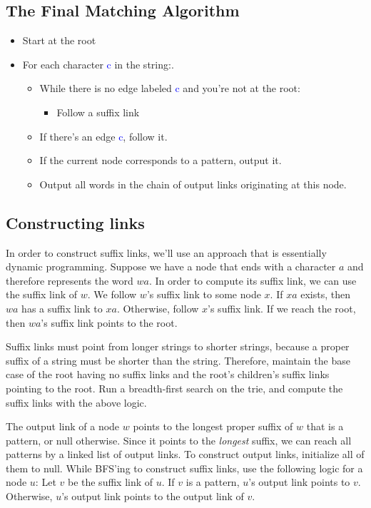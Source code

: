 \documentclass[11pt, oneside]{article}
\begin{document}
\subsection{The Final Matching Algorithm}

\begin{itemize}
    \item Start at the root
    \item For each character \textcolor{blue}{c} in the string:.
      \begin{itemize}
        \item While there is no edge labeled \textcolor{blue}{c} and you're not at the root:
          \begin{itemize}
            \item Follow a suffix link
          \end{itemize}
        \item If there's an edge \textcolor{blue}{c}, follow it.
        \item If the current node corresponds to a pattern, output it.
        \item Output all words in the chain of output links originating at this node.
      \end{itemize}
\end{itemize}

\newpage

\subsection{Constructing links}

In order to construct suffix links, we'll use an approach that is essentially dynamic programming.
Suppose we have a node that ends with a character \( a \) and therefore represents the word \( wa \).
In order to compute its suffix link, we can use the suffix link of \( w \).
We follow \( w \)'s suffix link to some node \( x \). If \( xa \) exists, then \( wa \) has a suffix link
to \( xa \). Otherwise, follow \( x \)'s suffix link. If we reach the root,
then \( wa \)'s suffix link points to the root.

Suffix links must point from longer strings to shorter strings, because a proper suffix of a string
must be shorter than the string. Therefore, maintain the base case of the root having no suffix links
and the root's children's suffix links pointing to the root. Run a breadth-first search on the trie,
and compute the suffix links with the above logic.

The output link of a node \( w \) points to the longest proper suffix of \( w \) that is a pattern,
or null otherwise. Since it points to the \textit{longest} suffix, we can reach all patterns
by a linked list of output links. To construct output links, initialize all of them to null.
While BFS'ing to construct suffix links, use the following logic for a node \( u \):
Let \( v \) be the suffix link of \( u \). If \( v \) is a pattern, \( u \)'s output link
points to \( v \). Otherwise, \( u \)'s output link points to the output link of \( v \).
\end{document}
